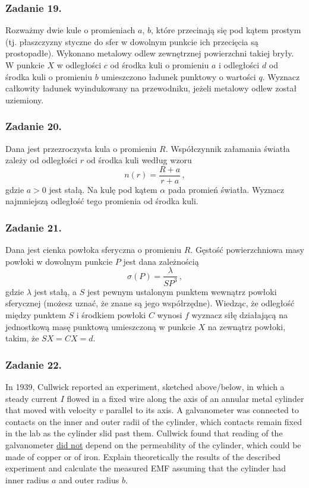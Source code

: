 \documentclass[a4paper, twocolumn]{article}
\begin{document}
\subsubsection*{Zadanie 19.}
Rozważmy dwie kule o promieniach \(a\), \(b\), które przecinają się pod kątem prostym (tj. płaszczyzny styczne do sfer w dowolnym punkcie ich przecięcia są prostopadłe). Wykonano metalowy odlew zewnętrznej powierzchni takiej bryły. W punkcie \(X\) w odległości \(c\) od środka kuli o promieniu \(a\) i odległości \(d\) od środka kuli o promieniu \(b\) umieszczono ładunek punktowy o wartości \(q\). Wyznacz całkowity ładunek wyindukowany na przewodniku, jeżeli metalowy odlew został uziemiony.

\subsubsection*{Zadanie 20.}
Dana jest przezroczysta kula o promieniu \(R\). Współczynnik załamania światła zależy od odległości \(r\) od środka kuli według wzoru
\begin{equation*}
    n(r)=\frac{R+a}{r+a}\,,
\end{equation*}
gdzie \(a>0\) jest stałą. Na kulę pod kątem \(\alpha\) pada promień światła. Wyznacz najmniejszą odległość tego promienia od środka kuli.

\subsubsection*{Zadanie 21.}
Dana jest cienka powłoka sferyczna o promieniu \(R\). Gęstość powierzchniowa masy powłoki w dowolnym punkcie \(P\) jest dana zależnością
\begin{equation*}
    \sigma(P)=\frac{\lambda}{SP^3}\,,
\end{equation*}
gdzie \(\lambda\) jest stałą, a \(S\) jest pewnym ustalonym punktem wewnątrz powłoki sferycznej (możesz uznać, że znane są jego współrzędne). Wiedząc, że odległość między punktem \(S\) i środkiem powłoki \(C\) wynosi \(f\) wyznacz siłę działającą na jednostkową masę punktową umieszczoną w punkcie \(X\) na zewnątrz powłoki, takim, że \(SX=CX=d\).

\subsubsection*{Zadanie 22.}
In 1939, Cullwick reported an experiment, sketched above/below, in which a steady current \(I\) flowed in a fixed wire along the axis of an annular metal cylinder that moved with velocity \(v\) parallel to its axis. A galvanometer was connected to contacts on the inner and outer radii of the cylinder, which contacts remain fixed in the lab as the cylinder slid past them. Cullwick found that reading of the galvanometer \underline{did not} depend on the permeability of the cylinder, which could be made of copper or of iron. Explain theoretically the results of the described experiment and calculate the measured EMF assuming that the cylinder had inner radius \(a\) and outer radius \(b\).
\end{document}
